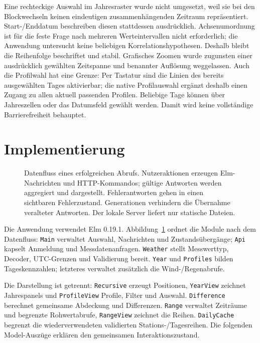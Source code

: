 \documentclass[usegeometry=true]{scrartcl}
\begin{document}
Eine rechteckige Auswahl im Jahresraster wurde nicht umgesetzt, weil sie
bei den Blockwechseln keinen eindeutigen zusammenhängenden Zeitraum
repräsentiert. Start-/Enddatum beschreiben diesen stattdessen ausdrücklich.
Achsenumordnung ist für die feste Frage nach mehreren Werteintervallen
nicht erforderlich; die Anwendung untersucht keine beliebigen
Korrelationshypothesen. Deshalb bleibt die Reihenfolge beschriftet und
stabil. Grafisches Zoomen wurde zugunsten einer ausdrücklich gewählten
Zeitspanne und benannter Auflösung weggelassen. Auch die Profilwahl hat
eine Grenze: Per Tastatur sind die Linien des bereits ausgewählten Tages
aktivierbar; die native Profilauswahl ergänzt deshalb einen Zugang zu allen
aktuell passenden Profilen. Beliebige Tage können über Jahreszellen oder das
Datumsfeld gewählt werden. Damit wird keine vollständige Barrierefreiheit
behauptet.

\section{Implementierung}
\begin{figure}[htbp]
  \centering
  
  \caption{Datenfluss eines erfolgreichen Abrufs. Nutzeraktionen erzeugen
  Elm-Nachrichten und HTTP-Kommandos; gültige Antworten werden aggregiert
  und dargestellt. Fehlerantworten gehen in einen sichtbaren Fehlerzustand.
  Generationen verhindern die Übernahme veralteter Antworten.
  Der lokale Server liefert nur statische Dateien.}
  \label{fig:architecture}
\end{figure}
Die Anwendung verwendet Elm 0.19.1. Abbildung~\ref{fig:architecture}
ordnet die Module nach dem Datenfluss: \texttt{Main} verwaltet Auswahl,
Nachrichten und Zustandsübergänge; \texttt{Api} kapselt Anmeldung und
Messdatenanfragen. \texttt{Weather} stellt Messwerttyp, Decoder,
UTC-Grenzen und Validierung bereit. \texttt{Year} und \texttt{Profiles}
bilden Tageskennzahlen; letzteres verwaltet zusätzlich die Wind-/Regenabrufe.

Die Darstellung ist getrennt: \texttt{Recursive} erzeugt Positionen,
\texttt{YearView} zeichnet Jahrespanels und \texttt{ProfileView}
Profile, Filter und Auswahl. \texttt{Difference} berechnet gemeinsame
Abdeckung und Differenzen. \texttt{Range} verwaltet Zeiträume und begrenzte
Rohwertabrufe, \texttt{RangeView} zeichnet die Reihen.
\texttt{DailyCache} begrenzt die wiederverwendeten validierten
Stations-/Tagesreihen. Die folgenden
Model-Auszüge erklären den gemeinsamen Interaktionszustand.
\end{document}
